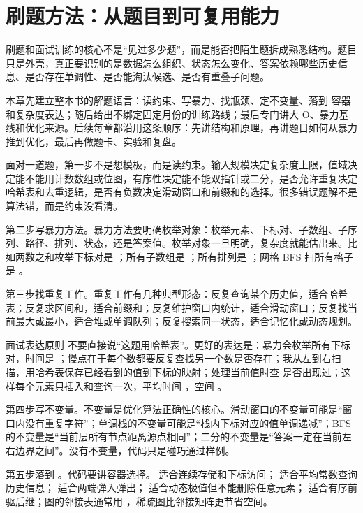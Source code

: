 \chapter{刷题方法：从题目到可复用能力}

刷题和面试训练的核心不是“见过多少题”，而是能否把陌生题拆成熟悉结构。题目只是外壳，真正要识别的是数据怎么组织、状态怎么变化、答案依赖哪些历史信息、是否存在单调性、是否能淘汰候选、是否有重叠子问题。

本章先建立整本书的解题语言：读约束、写暴力、找瓶颈、定不变量、落到 \cpp 容器和复杂度表达；随后给出不绑定固定月份的训练路线；最后专门讲大 O、暴力基线和优化来源。后续每章都沿用这条顺序：先讲结构和原理，再讲题目如何从暴力推到优化，最后再做题卡、实验和复盘。

面对一道题，第一步不是想模板，而是读约束。输入规模决定复杂度上限，值域决定能不能用计数数组或位图，有序性决定能不能双指针或二分，是否允许重复决定哈希表和去重逻辑，是否有负数决定滑动窗口和前缀和的选择。很多错误题解不是算法错，而是约束没看清。

第二步写暴力方法。暴力方法要明确枚举对象：枚举元素、下标对、子数组、子序列、路径、排列、状态，还是答案值。枚举对象一旦明确，复杂度就能估出来。比如两数之和枚举下标对是 ；所有子数组是 ；所有排列是 ；网格 BFS 扫所有格子是 。

第三步找重复工作。重复工作有几种典型形态：反复查询某个历史值，适合哈希表；反复求区间和，适合前缀和；反复维护窗口内统计，适合滑动窗口；反复找当前最大或最小，适合堆或单调队列；反复搜索同一状态，适合记忆化或动态规划。

\begin{principlebox}{面试表达原则}
不要直接说“这题用哈希表”。更好的表达是：暴力会枚举所有下标对，时间是 ；慢点在于每个数都要反复查找另一个数是否存在；我从左到右扫描，用哈希表保存已经看到的值到下标的映射；处理当前值时查  是否出现过；这样每个元素只插入和查询一次，平均时间 ，空间 。
\end{principlebox}

第四步写不变量。不变量是优化算法正确性的核心。滑动窗口的不变量可能是“窗口内没有重复字符”；单调栈的不变量可能是“栈内下标对应的值单调递减”；BFS 的不变量是“当前层所有节点距离源点相同”；二分的不变量是“答案一定在当前左右边界之间”。没有不变量，代码只是碰巧通过样例。

第五步落到 \cpp。\cpp 代码要讲容器选择。 适合连续存储和下标访问； 适合平均常数查询历史信息； 适合两端弹入弹出； 适合动态极值但不能删除任意元素； 适合有序前驱后继；图的邻接表通常用 ，稀疏图比邻接矩阵更节省空间。

